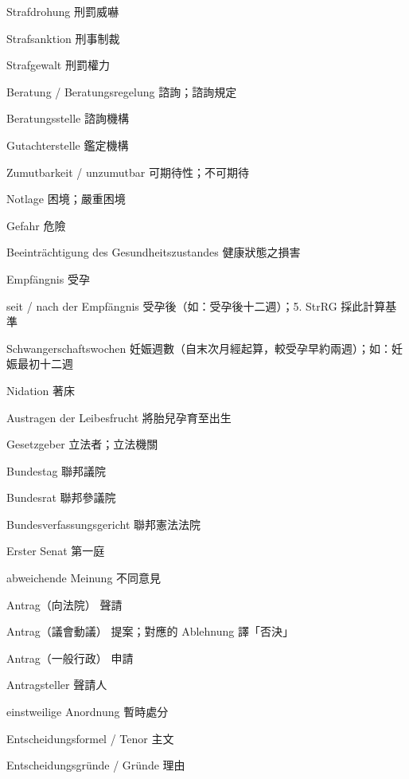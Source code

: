 \documentclass[12pt]{article}
\begin{document}
\begin{termbox}
\begin{termcolumns}
\begin{termitems}
\item[Strafdrohung] 刑罰威嚇
\item[Strafsanktion] 刑事制裁
\item[Strafgewalt] 刑罰權力
\item[Beratung / Beratungsregelung] 諮詢；諮詢規定
\item[Beratungsstelle] 諮詢機構
\item[Gutachterstelle] 鑑定機構
\item[Zumutbarkeit / unzumutbar] 可期待性；不可期待
\item[Notlage] 困境；嚴重困境
\item[Gefahr] 危險
\item[Beeinträchtigung des Gesundheitszustandes] 健康狀態之損害
\item[Empfängnis] 受孕
\item[seit / nach der Empfängnis] 受孕後（如：受孕後十二週）；5. StrRG 採此計算基準
\item[Schwangerschaftswochen] 妊娠週數（自末次月經起算，較受孕早約兩週）；如：妊娠最初十二週
\item[Nidation] 著床
\item[Austragen der Leibesfrucht] 將胎兒孕育至出生
\item[Gesetzgeber] 立法者；立法機關
\item[Bundestag] 聯邦議院
\item[Bundesrat] 聯邦參議院
\item[Bundesverfassungsgericht] 聯邦憲法法院
\item[Erster Senat] 第一庭
\item[abweichende Meinung] 不同意見
\item[Antrag（向法院）] 聲請
\item[Antrag（議會動議）] 提案；對應的 Ablehnung 譯「否決」
\item[Antrag（一般行政）] 申請
\item[Antragsteller] 聲請人
\item[einstweilige Anordnung] 暫時處分
\item[Entscheidungsformel / Tenor] 主文
\item[Entscheidungsgründe / Gründe] 理由
\end{termitems}
\end{termcolumns}


\end{termbox}
\end{document}
